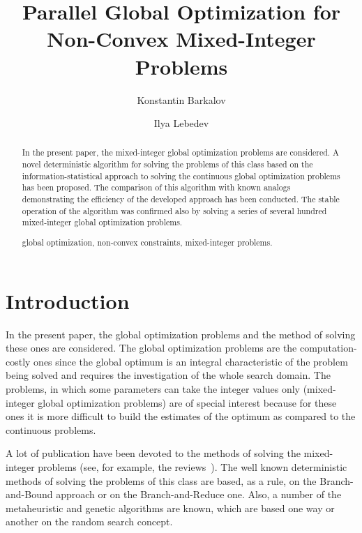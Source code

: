 \documentclass{llncs}
\begin{document}
\mainmatter 

\title{Parallel Global Optimization for Non-Convex Mixed-Integer Problems}
\author{Konstantin Barkalov \and Ilya Lebedev %
\\
}


\maketitle

\begin{abstract}
In the present paper, the mixed-integer global optimization problems are considered. A novel 
deterministic algorithm for solving the problems of this class based on the information-statistical 
approach to solving the continuous global optimization problems has been proposed. The 
comparison of this algorithm with known analogs demonstrating the efficiency of the 
developed approach has been conducted. The stable operation of the algorithm was confirmed 
also by solving a series of several hundred mixed-integer global optimization problems. 

\keywords global optimization, non-convex constraints, mixed-integer problems.

\end{abstract}

\section{Introduction}\label{sec:intro}

In the present paper, the global optimization problems and the method of solving these ones are 
considered. The global optimization problems are the computation-costly ones since the global 
optimum is an integral characteristic of the problem being solved and requires the investigation 
of the whole search domain. 
The problems, in which some parameters can take the integer values only (mixed-integer global 
optimization problems) are of special interest because for these ones it is more difficult to build 
the estimates of the optimum as compared to the continuous problems.

A lot of publication have been devoted to the methods of solving the mixed-integer problems 
(see, for example, the reviews~\cite{Burer,Boukouvala}). The well known deterministic 
methods of solving the problems of this class are based, as a rule, on the Branch-and-Bound 
approach or on the Branch-and-Reduce one. Also, a number of the metaheuristic and genetic 
algorithms are known, which are based one way or another on the random search concept.
\end{document}
